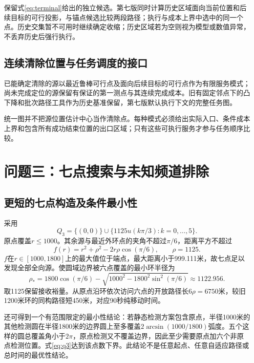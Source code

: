 \documentclass[UTF8,a4paper,zihao=-4,fontset=windows]{ctexart}
\begin{document}
保留式\eqref{eq:terminal}给出的独立候选。第七版同时计算历史区域面向当前位置和后续目标的可行投影，与锚点候选比较两段路径；执行与成本上界中选中的同一个点。历史交集暂不可用时继续确定收缩；历史区域若为空则视为模型或数值异常，不丢弃历史后强行执行。



\subsection{连续清除位置与任务调度的接口}
已能确定清除的源以最近鲁棒可行点及面向后续目标的可行点作为有限服务模式；尚未完成定位的源保留有保证的第一测点与其连续完成成本。旧有固定邻点下的凸下降和批次路径工具作为历史基准保留，第七版默认执行下文的完整任务图。

统一图并不把源位置估计中心当作清除点。每种模式必须给出实际入口、条件成本上界和包含所有成功结束位置的出口区域；只有这些可执行服务才参与任务顺序比较。

\section{问题三：七点搜索与未知频道排除}
\subsection{更短的七点构造及条件最小性}
采用
\begin{equation}\label{eq:q3}
Q_3=\{(0,0)\}\cup\{1125u(k\pi/3):k=0,\ldots,5\}.
\end{equation}
原点覆盖$r\le1000$。其余源与最近外环点的夹角不超过$\pi/6$，距离平方不超过
\begin{equation}
f(r)=r^2+\rho^2-2r\rho\cos(\pi/6),\qquad \rho=1125.
\end{equation}
$f$在$r\in[1000,1800]$上的最大值位于端点，最大距离小于999.111米，故七点足以发现全部全向源。使圆域边界被六点覆盖的最小环半径为
\begin{equation}
\rho_* = 1800\cos(\pi/6)
-\sqrt{1000^2-1800^2\sin^2(\pi/6)}
\approx1122.956.
\end{equation}
取1125保留接收裕量。从原点沿环依次访问六点的开放路径长$6\rho=6750$米，较旧1200米环的同构路径短450米，对应90秒纯移动时间。

还可得到一个有范围限定的最小性结论：若静态检测方案包含原点，半径1000米的其他检测圆在半径1800米的边界圆上至多覆盖$2\arcsin(1000/1800)$弧度。五个这样的圆总覆盖角小于$2\pi$，原点检测又不覆盖边界，因此至少需要原点加六个非原点检测位置。式\eqref{eq:q3}达到该点数下界。此结论不是任意起点、任意自适应路径或总时间的最优性结论。
\end{document}
